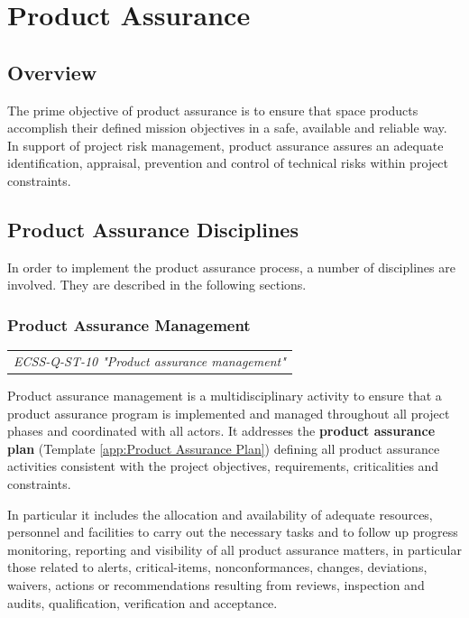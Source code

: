 \chapter{Product Assurance}

\section{Overview}

The prime objective of product assurance is to ensure that space products accomplish their defined mission objectives in a safe, available and reliable way. In support of project risk management, product assurance assures an adequate identification, appraisal, prevention and control of technical risks within project constraints.

\section{Product Assurance Disciplines}

In order to implement the product assurance process, a number of disciplines are involved. They are described in the following sections.

\subsection{Product Assurance Management}

\begin{tabular}{l}
\textit{ECSS-Q-ST-10 "Product assurance management" \cite{ECSS-Q-ST-10}}
\end{tabular}

Product assurance management is a multidisciplinary activity to ensure that a product assurance program is implemented and managed throughout all project phases and coordinated with all actors. It addresses the \textbf{product assurance plan} (Template \ref{app:Product Assurance Plan}) defining all product assurance activities consistent with the project objectives, requirements, criticalities and constraints. 

In particular it includes the allocation and availability of adequate resources, personnel and facilities to carry out the necessary tasks and to follow up progress monitoring, reporting and visibility of all product assurance matters, in particular those related to alerts, critical-items, nonconformances, changes, deviations, waivers, actions or recommendations resulting from reviews, inspection and audits, qualification, verification and acceptance.

